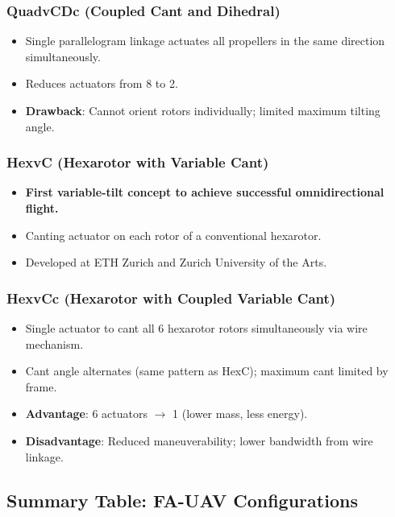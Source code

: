 \documentclass[11pt,a4paper]{article}
\begin{document}
\subsubsection*{QuadvCDc (Coupled Cant and Dihedral)}
\begin{itemize}
  \item Single parallelogram linkage actuates all propellers in the same direction simultaneously.
  \item Reduces actuators from 8 to 2.
  \item \textbf{Drawback}: Cannot orient rotors individually; limited maximum tilting angle.
\end{itemize}

\subsubsection*{HexvC (Hexarotor with Variable Cant)}
\begin{itemize}
  \item \textbf{First variable-tilt concept to achieve successful omnidirectional flight.}
  \item Canting actuator on each rotor of a conventional hexarotor.
  \item Developed at ETH Zurich and Zurich University of the Arts.
\end{itemize}

\subsubsection*{HexvCc (Hexarotor with Coupled Variable Cant)}
\begin{itemize}
  \item Single actuator to cant all 6 hexarotor rotors simultaneously via wire mechanism.
  \item Cant angle alternates (same pattern as HexC); maximum cant limited by frame.
  \item \textbf{Advantage}: 6 actuators $\to$ 1 (lower mass, less energy).
  \item \textbf{Disadvantage}: Reduced maneuverability; lower bandwidth from wire linkage.
\end{itemize}

\subsection{Summary Table: FA-UAV Configurations}
\end{document}
